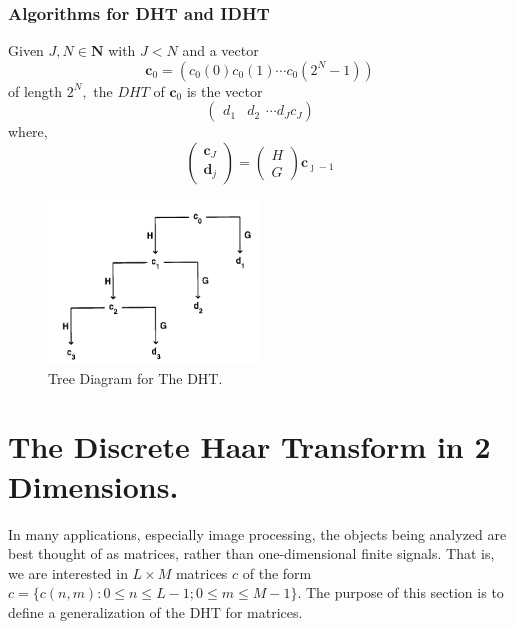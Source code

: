 \subsubsection{Algorithms for DHT and IDHT}

\begin{definition}
Given $J, N \in \mathbf{N}$ with $J<N$ and a vector
$$
\mathbf{c}_{0}=\left(c_{0}(0) c_{0}(1) \cdots c_{0}\left(2^{N}-1\right)\right)
$$
of length $2^{N},$ the $D H T$ of $\mathbf{c}_{0}$ is the vector
$$
\left(\begin{array}{ll}{d_{1}} & {d_{2}}\end{array} \cdots d_{J} c_{J}\right)
$$
where,
$$
\left(\begin{array}{c}{\mathbf{c}_{J}} \\ {\mathbf{d}_{j}}\end{array}\right)=\left(\begin{array}{c}{H} \\ {G}\end{array}\right) \mathbf{c}_{\jmath-1}
$$
\end{definition} 
\begin{figure}[h]
    \centering
    \includegraphics[width=0.5\textwidth]{sections/Tree.PNG}
    \caption{Tree Diagram for The DHT.}
    \label{fig:DHTS}
\end{figure}


\section{The Discrete Haar Transform in 2 Dimensions.}

In many applications, especially image processing, the objects being analyzed are best thought of as matrices, rather than one-dimensional finite signals. That is, we are interested in $L \times M$ matrices $c$ of the form $c=\{c(n, m): 0 \leq n \leq L-1 ; 0 \leq m \leq M-1\} .$ The purpose of this section is to define a generalization of the DHT for matrices.

